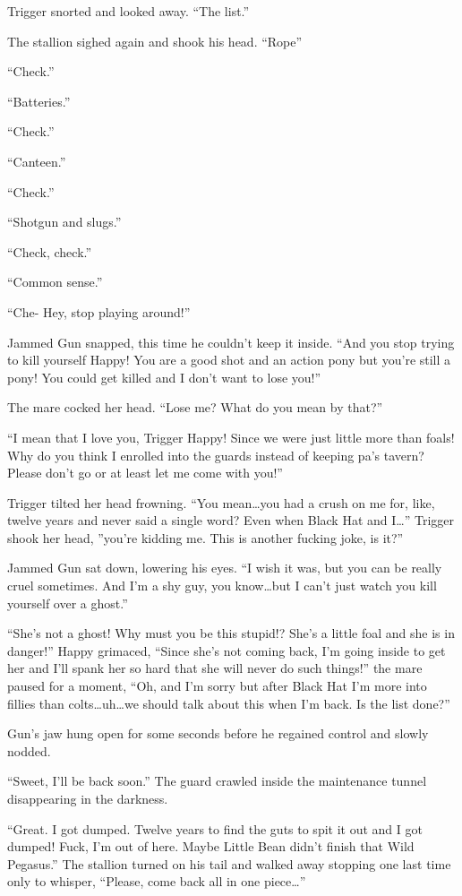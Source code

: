 Trigger snorted and looked away. ``The list.''

The stallion sighed again and shook his head. ``Rope''

``Check.''

``Batteries.''

``Check.''

``Canteen.''

``Check.''

``Shotgun and slugs.''

``Check, check.''

``Common sense.''

``Che- Hey, stop playing around!''

Jammed Gun snapped, this time he couldn't keep it inside. ``And you stop trying to kill yourself Happy! You are a good shot and an action pony but you're still a pony! You could get killed and I don't want to lose you!''

The mare cocked her head. ``Lose me? What do you mean by that?''

``I mean that I love you, Trigger Happy! Since we were just little more than foals! Why do you think I enrolled into the guards instead of keeping pa's tavern? Please don't go or at least let me come with you!''

Trigger tilted her head frowning. ``You mean\dots you had a crush on me for, like, twelve years and never said a single word? Even when Black Hat and I\dots'' Trigger shook her head, ''you're kidding me. This is another fucking joke, is it?''

Jammed Gun sat down, lowering his eyes. ``I wish it was, but you can be really cruel sometimes. And I'm a shy guy, you know\dots but I can't just watch you kill yourself over a ghost.''

``She's not a ghost! Why must you be this stupid!? She's a little foal and she is in danger!'' Happy grimaced, ``Since she's not coming back, I'm going inside to get her and I'll spank her so hard that she will never do such things!'' the mare paused for a moment, ``Oh, and I'm sorry but after Black Hat I'm more into fillies than colts\dots uh\dots we should talk about this when I'm back. Is the list done?''

Gun's jaw hung open for some seconds before he regained control and slowly nodded.

``Sweet, I'll be back soon.'' The guard crawled inside the maintenance tunnel disappearing in the darkness.

``Great. I got dumped. Twelve years to find the guts to spit it out and I got dumped! Fuck, I'm out of here. Maybe Little Bean didn't finish that Wild Pegasus.'' The stallion turned on his tail and walked away stopping one last time only to whisper, ``Please, come back all in one piece\dots''

